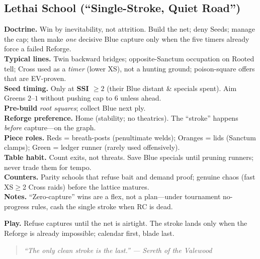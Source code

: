 \documentclass[11pt]{article}
\providecommand{\playdesc}[1]{\par\smallskip\noindent\small\textbf{Play.} #1\par}
\newcommand{\flavline}[2]{\noindent\textbf{#1.} \textit{#2}\par}
\begin{document}
\subsection*{Lethai School (``Single-Stroke, Quiet Road'')}
\textbf{Doctrine.} Win by inevitability, not attrition. Build the net; deny Seeds; manage the cap; then make \emph{one} decisive Blue capture only when the five timers  already force a failed Reforge. \\
\textbf{Typical lines.} Twin backward bridges; opposite-Sanctum occupation on Rooted tell; Cross used as a \emph{timer} (lower XS), not a hunting ground; poison-square offers that are EV-proven. \\
\textbf{Seed timing.} Only at \textbf{SSI $\ge 2$} (their Blue distant \& specials spent). Aim Greens $2$--$1$ without pushing cap to $6$ unless ahead. \\
\textbf{Pre-build} \emph{root squares}; collect Blue next ply. \\
\textbf{Reforge preference.} Home (stability; no theatrics). The ``stroke'' happens \emph{before} capture---on the graph. \\
\textbf{Piece roles.} Reds = breath-posts (penultimate welds); Oranges = lids (Sanctum clamps); Green = ledger runner (rarely used offensively). \\
\textbf{Table habit.} Count exits, not threats. Save Blue specials until pruning runners; never trade them for tempo. \\
\textbf{Counters.} Parity schools that refuse bait and demand proof; genuine chaos (fast XS$\geq$2 Cross raids) before the lattice matures. \\
\textbf{Notes.} ``Zero-capture'' wins are a flex, not a plan---under tournament no-progress rules, cash the single stroke when RC is dead.
\playdesc{Refuse captures until the net is airtight. The stroke lands only when the Reforge is already impossible; calendar first, blade last.}
\providecommand{\flavline}[2]{\noindent\textbf{#1.} \textit{#2}\par}
\begin{quote}\small\itshape
``The only clean stroke is the last.'' --- Sereth of the Valewood
\end{quote}
\end{document}

